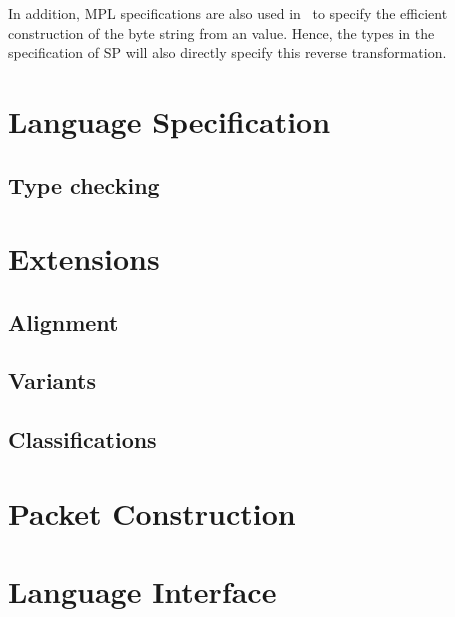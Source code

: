 \documentclass{article}
\begin{document}
In addition, MPL specifications are also used
in~\cite{Madhavapeddy:thesis} to specify the efficient construction of
the byte string from an \OCaml value.  Hence, the types in the
specification of SP will also directly specify this reverse
transformation.

\section{Language Specification}


\subsection{Type checking}

\section{Extensions}

\subsection{Alignment}
\subsection{Variants}
\subsection{Classifications}

\section{Packet Construction}

\section{Language Interface}



\end{document}
